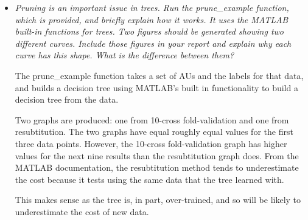 \documentclass[a4paper]{article}
\begin{document}
\begin{itemize}
    \item \emph{Pruning is an important issue in trees. Run the prune\_example
        function, which is provided, and briefly explain how it works. It uses the
        MATLAB built-in functions for trees. Two figures should be generated showing
        two different curves. Include those figures in your report and explain why
        each curve has this shape. What is the difference between them?}

      The prune\_example function takes a set of AUs and the labels for that data,
      and builds a decision tree using MATLAB's built in functionality to build a
      decision tree from the data.

      Two graphs are produced: one from 10-cross fold-validation and one from
      resubtitution. The two graphs have equal roughly equal values for the first
      three data points. However, the 10-cross fold-validation graph has higher
      values for the next nine results than the resubtitution graph does.
      From the MATLAB documentation, the resubtitution method tends to underestimate
      the cost because it tests using the same data that the tree learned with.

      This makes sense as the tree is, in part, over-trained, and so will be likely to
      underestimate the cost of new data.


  \end{itemize}

  
\end{document}
